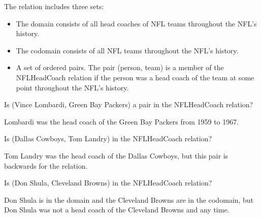 \documentclass{ximera}
\begin{document}
  
  \begin{definition}
  The  relation includes three sets:
    \begin{itemize}
    \item The domain consists of all head coaches of NFL teams throughout the NFL's history.
    \item The codomain consists of all NFL teams throughout the NFL's history.
    \item A set of ordered pairs. The pair (person, team) is a member of the NFLHeadCoach relation if the  person was a head coach of the team at some point throughout the NFL's history.
    \end{itemize}
  
  \end{definition}
  




\begin{exercise}
Is (Vince Lombardi, Green Bay Packers) a pair in the NFLHeadCoach relation?

  \begin{multipleChoice}
  \end{multipleChoice}
  \begin{feedback}
Lombardi was the head coach of the Green Bay Packers from 1959 to 1967.
  \end{feedback}
\end{exercise}






\begin{exercise}
Is (Dallas Cowboys, Tom Landry) in the NFLHeadCoach relation?

  \begin{multipleChoice}
  \end{multipleChoice}
  \begin{feedback}
Tom Landry was the head coach of the Dallas Cowboys, but this pair is backwards for the relation.
  \end{feedback}
\end{exercise}





\begin{exercise}
Is (Don Shula, Cleveland Browns) in the NFLHeadCoach relation?

  \begin{multipleChoice}
  \end{multipleChoice}
  \begin{feedback}
Don Shula is in the domain and the Cleveland Browns are in the codomain, but Don Shula was not a head coach of the Cleveland Browns and any time.
\end{feedback}
\end{exercise}
\end{document}
